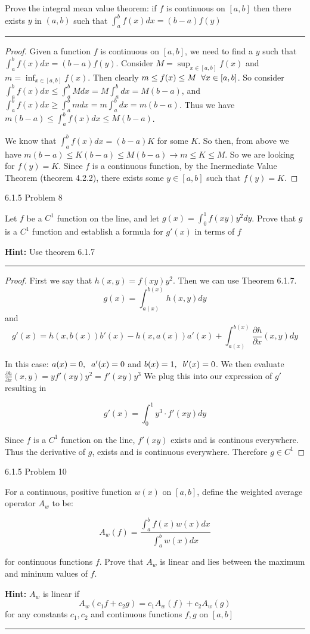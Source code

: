 \documentclass[11pt]{article}
\begin{document}
Prove the integral mean value theorem: if $f$ is continuous on $[a,b]$ then there exists $y$ in $(a,b)$ 
such that $\int_a ^b f(x) dx = (b - a)f(y)$
\hrule


\begin{proof}
    Given a function $f$ is continuous on $[a,b]$, we need to find a $y$ such that $\int_a ^b f(x) dx = (b-a) f(y)$. 
    Consider $M = \sup_{x \in [a,b]}f(x)$ and $m = \inf_{x \in [a,b]}f(x)$. Then clearly $m \leq f(x) \leq M \sp \forall x \in [a,b]$. 
    So consider $\int_a ^b f(x)dx \leq \int_a ^b Mdx = M \int_a ^b dx = M(b - a)$, and $\int_a ^b f(x)dx \geq \int_a ^b mdx = m \int_a ^b dx = m(b - a)$.
    Thus we have $m (b - a) \leq \int_a ^b f(x) dx \leq M (b - a)$.

    We know that $\int_a ^b f(x) dx = (b - a) K$ for some $K$. So then, from above we have $m (b - a) \leq K (b-a) \leq M (b - a) \rightarrow m \leq K \leq M$.
    So we are looking for $f(y) = K$. Since $f$ is a continuous function, by the Inermediate Value Theorem (theorem 4.2.2), there exists some $y \in [a,b]$ such that $f(y) = K$.

\end{proof}





 6.1.5 Problem 8

Let $f$ be a $C^1$ function on the line, and let $g(x) = \int_0 ^1 f(xy)y^2 dy$.
Prove that $g$ is a $C^1$ function and establish a formula for $g'(x)$ in terms of $f$

\textbf{Hint:} Use theorem 6.1.7
\hrule

\begin{proof}
    First we say that $h(x,y) = f(xy)y^2$. Then we can use Theorem 6.1.7. $$g(x) = \int_{a(x)} ^{b(x)} h(x,y) dy$$
    and $$g'(x) = h(x, b(x))b'(x) - h(x, a(x))a'(x) + \int_{a(x)} ^{b(x)} \frac{\partial h}{\partial x}(x,y)dy$$

    In this case: $a(x) = 0, \sp a'(x) = 0$ and $b(x) = 1, \sp b'(x) = 0$. 
    We then evaluate $\frac{\partial h}{\partial x}(x,y) = y f'(xy)y^2 = f'(xy) y^3$
    We plug this into our expression of $g'$ resulting in 

    $$g'(x) = \int_0 ^1 y^3 \cdot f'(xy) dy$$

    Since $f$ is a $C^1$ function on the line, $f'(xy)$ exists and is continous everywhere. 
    Thus the derivative of $g$, exists and is continuous everywhere. Therefore $g \in C^1$
\end{proof}



 6.1.5 Problem 10

For a continuous, positive function $w(x)$ on $[a,b]$, define the weighted average operator $A_w$ to be:

$$A_w(f) = \frac{ \int_a ^b f(x) w(x) dx }{ \int_a ^b w(x) dx}$$

for continuous functions $f$. Prove that $A_w$ is linear and lies between the maximum and mininum values of $f$.

\textbf{Hint:} $A_w$ is linear if
$$A_w (c_1 f + c_2 g) = c_1 A_w (f) + c_2 A_w (g)$$
for any constants $c_1, c_2$ and continuous functions $f,g$ on $[a,b]$
\hrule
\end{document}
